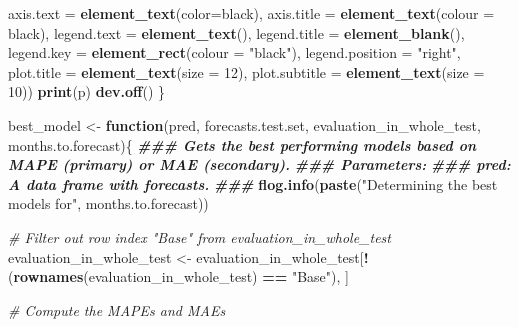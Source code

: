 \documentclass[
]{article}
\newenvironment{Shaded}{\begin{snugshade}}{\end{snugshade}}
\newcommand{\AttributeTok}[1]{\textcolor[rgb]{0.13,0.29,0.53}{#1}}
\newcommand{\CommentTok}[1]{\textcolor[rgb]{0.56,0.35,0.01}{\textit{#1}}}
\newcommand{\ControlFlowTok}[1]{\textcolor[rgb]{0.13,0.29,0.53}{\textbf{#1}}}
\newcommand{\DecValTok}[1]{\textcolor[rgb]{0.00,0.00,0.81}{#1}}
\newcommand{\DocumentationTok}[1]{\textcolor[rgb]{0.56,0.35,0.01}{\textbf{\textit{#1}}}}
\newcommand{\FunctionTok}[1]{\textcolor[rgb]{0.13,0.29,0.53}{\textbf{#1}}}
\newcommand{\NormalTok}[1]{#1}
\newcommand{\OtherTok}[1]{\textcolor[rgb]{0.56,0.35,0.01}{#1}}
\newcommand{\SpecialCharTok}[1]{\textcolor[rgb]{0.81,0.36,0.00}{\textbf{#1}}}
\newcommand{\StringTok}[1]{\textcolor[rgb]{0.31,0.60,0.02}{#1}}
\begin{document}
\begin{Shaded}
\begin{Highlighting}[]
          \AttributeTok{axis.text =} \FunctionTok{element\_text}\NormalTok{(}\AttributeTok{color=}\StringTok{\textquotesingle{}black\textquotesingle{}}\NormalTok{),}
          \AttributeTok{axis.title =} \FunctionTok{element\_text}\NormalTok{(}\AttributeTok{colour =} \StringTok{\textquotesingle{}black\textquotesingle{}}\NormalTok{),}
          \AttributeTok{legend.text =} \FunctionTok{element\_text}\NormalTok{(),}
          \AttributeTok{legend.title =} \FunctionTok{element\_blank}\NormalTok{(),}
          \AttributeTok{legend.key =} \FunctionTok{element\_rect}\NormalTok{(}\AttributeTok{colour =} \StringTok{"black"}\NormalTok{),}
          \AttributeTok{legend.position =} \StringTok{"right"}\NormalTok{,}
          \AttributeTok{plot.title =} \FunctionTok{element\_text}\NormalTok{(}\AttributeTok{size =} \DecValTok{12}\NormalTok{),}
          \AttributeTok{plot.subtitle =} \FunctionTok{element\_text}\NormalTok{(}\AttributeTok{size =} \DecValTok{10}\NormalTok{))}
  \FunctionTok{print}\NormalTok{(p)}
  \FunctionTok{dev.off}\NormalTok{()}
\NormalTok{\}}

\NormalTok{best\_model }\OtherTok{\textless{}{-}} \ControlFlowTok{function}\NormalTok{(pred, forecasts.test.set, evaluation\_in\_whole\_test, months.to.forecast)\{}
\DocumentationTok{\#\#\# Gets the best performing models based on MAPE (primary) or MAE (secondary).}
\DocumentationTok{\#\#\# Parameters:}
\DocumentationTok{\#\#\# pred: A data frame with forecasts.}
\DocumentationTok{\#\#\#}
  \FunctionTok{flog.info}\NormalTok{(}\FunctionTok{paste}\NormalTok{(}\StringTok{"Determining the best models for"}\NormalTok{, months.to.forecast))}

  \CommentTok{\# Filter out row index "Base" from evaluation\_in\_whole\_test}
\NormalTok{  evaluation\_in\_whole\_test }\OtherTok{\textless{}{-}}\NormalTok{ evaluation\_in\_whole\_test[}\SpecialCharTok{!}\NormalTok{(}\FunctionTok{rownames}\NormalTok{(evaluation\_in\_whole\_test) }\SpecialCharTok{==} \StringTok{"Base"}\NormalTok{), ]}

  \CommentTok{\# Compute the MAPEs and MAEs}


\end{Highlighting}
\end{Shaded}
\end{document}
